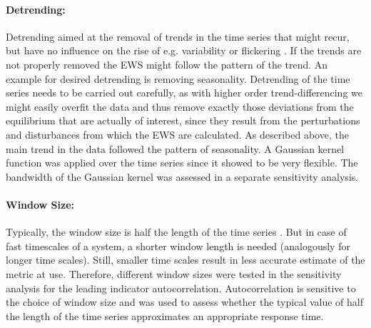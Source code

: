 \paragraph{Detrending:}
Detrending aimed at the removal of trends in the time series that might recur, but have no influence on the rise of e.g. variability or \gls{flickering} \citep{dakos2012}. If the trends are not properly removed the EWS might follow the pattern of the trend. An example for desired detrending is removing seasonality. Detrending of the time series needs to be carried out carefully, as with higher order trend-differencing we might easily overfit the data \citep{dakos2008} and thus remove exactly those deviations from the equilibrium that are actually of interest, since they result from the perturbations and disturbances from which the EWS are calculated. As described above, the main trend in the data followed the pattern of seasonality. A Gaussian kernel function was applied over the time series since it showed to be very flexible. The bandwidth of the Gaussian kernel was assessed in a separate sensitivity analysis.\\

\paragraph{Window Size:}
Typically, the window size is half the length of the time series \citep{dakos2012}. But in case of fast timescales of a system, a shorter window length is needed (analogously for longer time scales). Still, smaller time scales result in less accurate estimate of the metric at use. Therefore, different window sizes were tested in the sensitivity analysis for the leading indicator autocorrelation. Autocorrelation is sensitive to the choice of window size and was used to assess whether the typical value of half the length of the time series approximates an appropriate response time.\\

